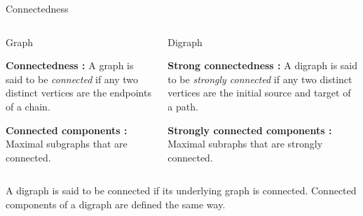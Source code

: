 \documentclass[32pt,aspectratio=169]{beamer}
\begin{document}
\begin{frame}{Connectedness}
\begin{columns}[T]
    \begin{column}{.55\textwidth}
      \begin{halfshyblock}{Graph}
        {\small
          \textbf{Connectedness :} A graph is said to be
          \emph{connected} if any two distinct vertices are the endpoints of
          a chain.

          \textbf{Connected components :} Maximal subgraphs that are
          connected.
          }
      \end{halfshyblock}
    \end{column}
    \begin{column}{.55\textwidth}
      \begin{halfshyblock}{Digraph}
        {\small
          \textbf{Strong connectedness :} A digraph is said to be
          \emph{strongly connected} if any two distinct vertices are the
          initial source and target of a path.

          \textbf{Strongly connected components :} Maximal subraphs
          that are strongly connected.}
      \end{halfshyblock}
    \end{column}
  \end{columns}
  \vspace{\baselineskip}
  \begin{rem}
    A digraph is said to be connected if its underlying graph is
    connected. Connected components of a digraph are defined the
    same way.
  \end{rem}
\end{frame}
\end{document}
